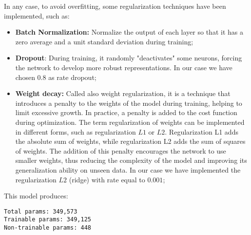 In any case, to avoid overfitting, some regularization techniques have been implemented, such as:
\begin{itemize}
\item{\textbf{Batch Normalization:} Normalize the output of each layer so that it has a zero average and a unit standard deviation during training;}
\item{\textbf{Dropout}: During training, it randomly "deactivates" some neurons, forcing the network to develop more robust representations. In our case we have chosen $0.8$ as rate dropout;}
\item{\textbf{Weight decay:} Called also weight regularization, it is a technique that introduces a penalty to the weights of the model during training, helping to limit excessive growth. In practice, a penalty is added to the cost function during optimization. The term regularization of weights can be implemented in different forms, such as regularization $L1$ or $L2$. Regularization L1 adds the absolute sum of weights, while regularization L2 adds the sum of squares of weights. The addition of this penalty encourages the network to use smaller weights, thus reducing the complexity of the model and improving its generalization ability on unseen data. In our case we have implemented the regularization $L2$ (ridge) with rate equal to $0.001$;}
\end{itemize}
This model produces:
\begin{verbatim}
Total params: 349,573
Trainable params: 349,125
Non-trainable params: 448
\end{verbatim}

